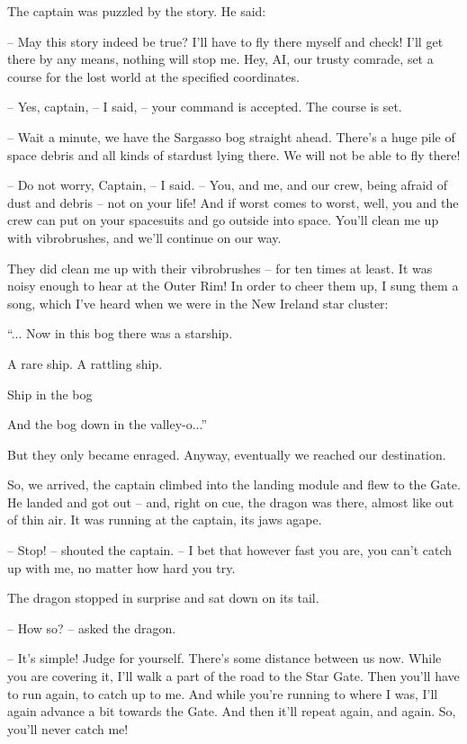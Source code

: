 \documentclass[ebook,oneside,final,openright]{memoir}
\begin{document}
\par
The captain was puzzled by the story. He said:\par
– May this story indeed be true? I’ll have to fly there myself and check! I’ll get there by any means, nothing will stop me. Hey, AI, our trusty comrade, set a course for the lost world at the specified coordinates.\par
– Yes, captain, – I said, – your command is accepted. The course is set.\par
– Wait a minute, we have the Sargasso bog straight ahead. There’s a huge pile of space debris and all kinds of stardust lying there. We will not be able to fly there!\par
– Do not worry, Captain, – I said. – You, and me, and our crew, being afraid of dust and debris – not on your life! And if worst comes to worst, well, you and the crew can put on your spacesuits and go outside into space. You’ll clean me up with vibrobrushes, and we’ll continue on our way.\par
\par
They did clean me up with their vibrobrushes – for ten times at least. It was noisy enough to hear at the Outer Rim! In order to cheer them up, I sung them a song, which I’ve heard when we were in the New Ireland star cluster: \par
“... Now in this bog there was a starship.\par
A rare ship. A rattling ship.\par
Ship in the bog\par
And the bog down in the valley-o...”\par
 But they only became enraged. Anyway, eventually we reached our destination.\par
\par
So, we arrived, the captain climbed into the landing module and flew to the Gate. He landed and got out – and, right on cue, the dragon was there, almost like out of thin air. It was running at the captain, its jaws agape.\par
– Stop! – shouted the captain. – I bet that however fast you are, you can’t catch up with me, no matter how hard you try.\par
The dragon stopped in surprise and sat down on its tail.\par
– How so? – asked the dragon.\par
– It’s simple! Judge for yourself. There’s some distance between us now. While you are covering it, I’ll walk a part of the road to the Star Gate. Then you’ll have to run again, to catch up to me. And while you’re running to where I was, I’ll again advance a bit towards the Gate. And then it’ll repeat again, and again. So, you’ll never catch me!\par
\end{document}

